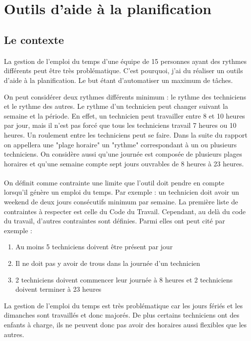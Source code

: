 \section{Outils d'aide à la planification}

\subsection{Le contexte}%
\paragraph{}
La gestion de l'emploi du temps d'une équipe de 15 personnes ayant des rythmes différents peut être très problématique. C'est pourquoi, j'ai du réaliser un outils d'aide à la planification. Le but étant d'automatiser un maximum de tâches. 

On peut considérer deux rythmes différents minimum : le rythme des techniciens et le rythme des autres. Le rythme d'un technicien peut changer suivant la semaine et la période. En effet, un technicien peut travailler entre 8 et 10 heures par jour, mais il n'est pas forcé que tous les techniciens travail 7 heures ou 10 heures. Un roulement entre les techniciens peut se faire. 
Dans la suite du rapport on appellera une "plage horaire" un "rythme" correspondant à un ou plusieurs techniciens.
On considère aussi qu'une journée est composée de plusieurs plages horaires et qu'une semaine compte sept jours ouvrables de 8 heures à 23 heures.

\paragraph{}
On définit comme contrainte une limite que l’outil doit pendre en compte lorsqu'il génère un emploi du temps. Par exemple : un technicien doit avoir un weekend de deux jours consécutifs minimum par semaine. 
La première liste de contraintes à respecter est celle du Code du Travail. Cependant, au delà du code du travail, d'autres contraintes sont définies. Parmi elles ont peut cité par exemple : 
\begin{enumerate}
  \item Au moins 5 techniciens doivent être présent par jour
  \item Il ne doit pas y avoir de trous dans la journée d'un technicien
  \item 2 techniciens doivent commencer leur journée à 8 heures et 2 techniciens doivent terminer à 23 heures
\end{enumerate}
La gestion de l'emploi du temps est très problématique car les jours fériés et les dimanches sont travaillés et donc majorés. De plus certains techniciens ont des enfants à charge, ils ne peuvent donc pas avoir des horaires aussi flexibles que les autres.





